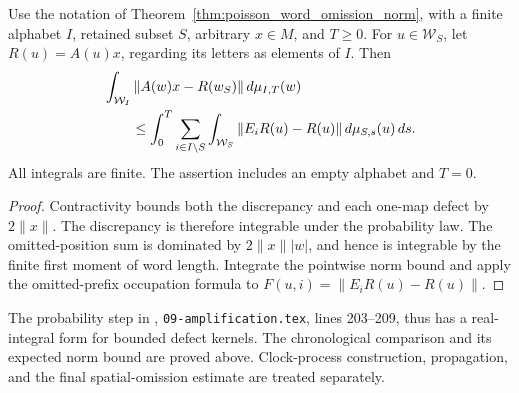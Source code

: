 \begin{theorem}
\label{thm:poisson_word_expected_omission_norm}
\leanok
{}
Use the notation of Theorem~\ref{thm:poisson_word_omission_norm}, with a
finite alphabet $I$, retained subset $S$, arbitrary $x\in M$, and $T\geq0$.
For $u\in\mathcal W_S$, let $R(u)=A(u)x$, regarding its letters as elements
of $I$. Then
\begin{align}
 &\int_{\mathcal W_I}\|A(w)x-R(w_S)\|\,d\mu_{I,T}(w)\notag\\
 &\qquad\leq\int_0^T\sum_{i\in I\setminus S}\int_{\mathcal W_S}
 \|E_iR(u)-R(u)\|\,d\mu_{S,s}(u)\,ds.
 \label{eq:poisson_word_expected_omission_norm}
\end{align}
All integrals are finite. The assertion includes an empty alphabet and
$T=0$.
\end{theorem}
\begin{proof}\leanok
{}
Contractivity bounds both the discrepancy and each one-map defect by
$2\|x\|$. The discrepancy is therefore integrable under the probability
law. The omitted-position sum is dominated by $2\|x\||w|$, and hence is
integrable by the finite first moment of word length. Integrate the
pointwise norm bound and apply the omitted-prefix occupation formula to
$F(u,i)=\|E_iR(u)-R(u)\|$.
\end{proof}

The probability step in \cite{OpenAI2026AreaLaw},
\texttt{09-amplification.tex}, lines 203--209, thus has a real-integral
form for bounded defect kernels. The chronological comparison and its
expected norm bound are proved above. Clock-process construction, propagation,
and the final spatial-omission estimate are treated separately.
